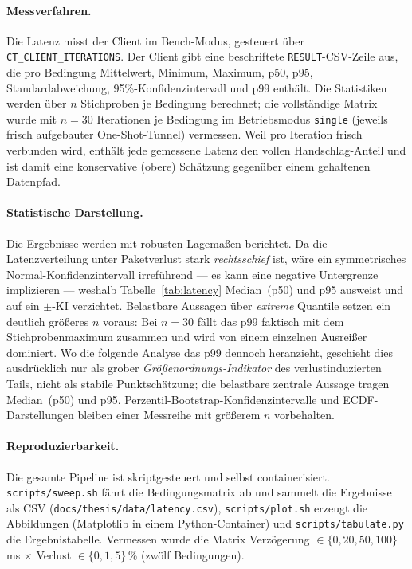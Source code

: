 \paragraph{Messverfahren.} Die Latenz misst der Client im Bench-Modus, gesteuert
über \texttt{CT\_CLIENT\_ITERATIONS}. Der Client gibt eine beschriftete
\texttt{RESULT}-CSV-Zeile aus, die pro Bedingung Mittelwert, Minimum, Maximum,
p50, p95, Standardabweichung, 95\%-Konfidenzintervall und p99 enthält. Die
Statistiken werden über $n$ Stichproben je Bedingung berechnet; die vollständige
Matrix wurde mit $n=30$ Iterationen je Bedingung im Betriebsmodus
\texttt{single} (jeweils frisch aufgebauter One-Shot-Tunnel) vermessen. Weil pro
Iteration frisch verbunden wird, enthält jede gemessene Latenz den vollen
Handschlag-Anteil und ist damit eine konservative (obere) Schätzung gegenüber
einem gehaltenen Datenpfad.

\paragraph{Statistische Darstellung.} Die Ergebnisse werden mit robusten
Lagemaßen berichtet. Da die Latenzverteilung unter Paketverlust stark
\emph{rechtsschief} ist, wäre ein symmetrisches Normal-Konfidenzintervall
irreführend --- es kann eine negative Untergrenze implizieren --- weshalb
Tabelle~\ref{tab:latency} Median~(p50) und p95 ausweist und auf ein
$\pm$-KI verzichtet. Belastbare Aussagen über \emph{extreme} Quantile setzen ein
deutlich größeres $n$ voraus: Bei $n=30$ fällt das p99 faktisch mit dem
Stichprobenmaximum zusammen und wird von einem einzelnen Ausreißer dominiert. Wo
die folgende Analyse das p99 dennoch heranzieht, geschieht dies ausdrücklich nur
als grober \emph{Größenordnungs-Indikator} des verlustinduzierten Tails, nicht als
stabile Punktschätzung; die belastbare zentrale Aussage tragen Median~(p50) und
p95. Perzentil-Bootstrap-Konfidenzintervalle und ECDF-Darstellungen bleiben einer
Messreihe mit größerem $n$ vorbehalten.

\paragraph{Reproduzierbarkeit.} Die gesamte Pipeline ist skriptgesteuert und
selbst containerisiert. \texttt{scripts/sweep.sh} fährt die Bedingungsmatrix ab
und sammelt die Ergebnisse als CSV
(\texttt{docs/thesis/data/latency.csv}), \texttt{scripts/plot.sh} erzeugt die
Abbildungen (Matplotlib in einem Python-Container) und
\texttt{scripts/tabulate.py} die Ergebnistabelle. Vermessen wurde die Matrix
Verzögerung $\in \{0, 20, 50, 100\}$\,ms $\times$ Verlust $\in \{0, 1, 5\}$\,\%
(zwölf Bedingungen).

